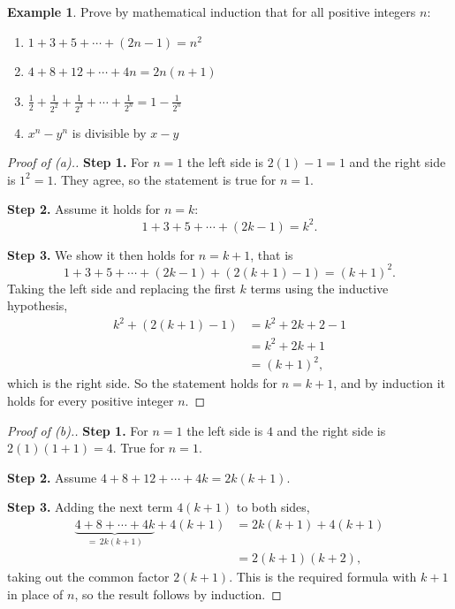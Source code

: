 \documentclass[11pt,a4paper]{article}
\theoremstyle{definition}
\newtheorem{example}[thm]{Example}
\begin{document}
\begin{example}
Prove by mathematical induction that for all positive integers $n$:
\begin{enumerate}
\item[(a).] $1+3+5+\cdots+(2n-1)=n^{2}$
\item[(b).] $4+8+12+\cdots+4n=2n(n+1)$
\item[(c).] $\frac{1}{2}+\frac{1}{2^{2}}+\frac{1}{2^{3}}+\cdots+\frac{1}{2^{n}}=1-\frac{1}{2^{n}}$
\item[(d).] $x^{n}-y^{n}$ is divisible by $x-y$
\end{enumerate}
\end{example}

\begin{proof}[\textit{Proof of }(a).]
\textbf{Step 1.} For $n=1$ the left side is $2(1)-1=1$ and the right side is
$1^{2}=1$. They agree, so the statement is true for $n=1$.

\textbf{Step 2.} Assume it holds for $n=k$:
$$1+3+5+\cdots+(2k-1)=k^{2}.$$

\textbf{Step 3.} We show it then holds for $n=k+1$, that is
$$1+3+5+\cdots+(2k-1)+\left(2(k+1)-1\right)=(k+1)^{2}.$$
Taking the left side and replacing the first $k$ terms using the inductive
hypothesis,
\begin{align*}
k^{2}+\left(2(k+1)-1\right) &= k^{2}+2k+2-1\\
                            &= k^{2}+2k+1\\
                            &= (k+1)^{2},
\end{align*}
which is the right side. So the statement holds for $n=k+1$, and by induction it
holds for every positive integer $n$.
\end{proof}

\begin{proof}[\textit{Proof of }(b).]
\textbf{Step 1.} For $n=1$ the left side is $4$ and the right side is
$2(1)(1+1)=4$. True for $n=1$.

\textbf{Step 2.} Assume $4+8+12+\cdots+4k=2k(k+1)$.

\textbf{Step 3.} Adding the next term $4(k+1)$ to both sides,
\begin{align*}
\underbrace{4+8+\cdots+4k}_{=\,2k(k+1)}+4(k+1)
 &= 2k(k+1)+4(k+1)\\
 &= 2(k+1)(k+2),
\end{align*}
taking out the common factor $2(k+1)$. This is the required formula with $k+1$ in
place of $n$, so the result follows by induction.
\end{proof}
\end{document}
